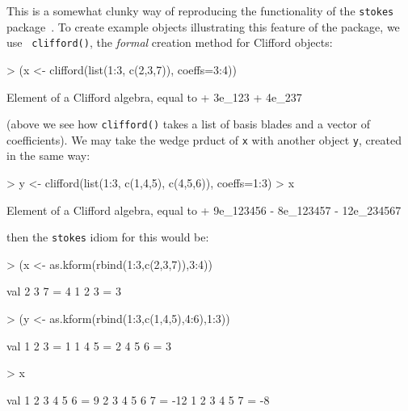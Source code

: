 \documentclass{birkjour}
\theoremstyle{definition}
\theoremstyle{remark}
\numberwithin{equation}{section}
\begin{document}
This is a somewhat clunky way of reproducing the functionality of the
{\tt stokes} package~\cite{hankin2022_stokes_arxiv}.  To create
example objects illustrating this feature of the package, we use {\tt
  clifford()}, the {\em formal} creation method for Clifford objects:

\begin{Schunk}
\begin{Sinput}
> (x <- clifford(list(1:3, c(2,3,7)), coeffs=3:4))
\end{Sinput}
\begin{Soutput}
Element of a Clifford algebra, equal to
+ 3e_123 + 4e_237
\end{Soutput}
\end{Schunk}

(above we see how {\tt clifford()} takes a list of basis blades and a
vector of coefficients).  We may take the wedge prduct of {\tt x} with
another object {\tt y}, created in the same way:

\begin{Schunk}
\begin{Sinput}
> y <- clifford(list(1:3, c(1,4,5), c(4,5,6)), coeffs=1:3)
> x %
\end{Sinput}
\begin{Soutput}
Element of a Clifford algebra, equal to
+ 9e_123456 - 8e_123457 - 12e_234567
\end{Soutput}
\end{Schunk}

then the {\tt stokes} idiom for this would be:

\begin{Schunk}
\begin{Sinput}
> (x <- as.kform(rbind(1:3,c(2,3,7)),3:4))
\end{Sinput}
\begin{Soutput}
           val
 2 3 7  =    4
 1 2 3  =    3
\end{Soutput}
\begin{Sinput}
> (y <- as.kform(rbind(1:3,c(1,4,5),4:6),1:3))
\end{Sinput}
\begin{Soutput}
           val
 1 2 3  =    1
 1 4 5  =    2
 4 5 6  =    3
\end{Soutput}
\begin{Sinput}
> x %
\end{Sinput}
\begin{Soutput}
                 val
 1 2 3 4 5 6  =    9
 2 3 4 5 6 7  =  -12
 1 2 3 4 5 7  =   -8
\end{Soutput}
\end{Schunk}
\end{document}
